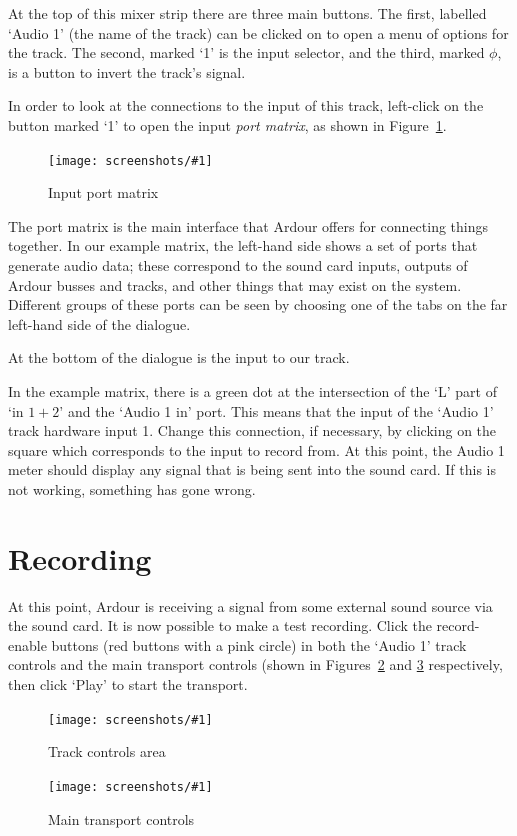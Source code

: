 \documentclass[10pt,a4paper]{book}
\newcommand{\screenshot}[3]{%
\begin{figure}[ht]%
\begin{center}
\texttt{[image: screenshots/\#1]}
\end{center}
\caption{#2}
\label{#3}
\end{figure}}
\begin{document}
{At the top of this mixer strip there are three main buttons.  The
first, labelled `Audio 1' (the name of the track) can be clicked on to
open a menu of options for the track.  The second, marked `1' is the
input selector, and the third, marked $\phi$, is a button to invert
the track's signal.

In order to look at the connections to the input of this track,
left-click on the button marked `1' to open the input \emph{port
  matrix}, as shown in Figure~\ref{fig:input-port-matrix}.

\screenshot{input-port-matrix.png}{Input port matrix}{fig:input-port-matrix}

The port matrix is the main interface that Ardour offers for
connecting things together.  In our example matrix, the left-hand side
shows a set of ports that generate audio data; these correspond to the
sound card inputs, outputs of Ardour busses and tracks, and other
things that may exist on the system.  Different groups of these ports
can be seen by choosing one of the tabs on the far left-hand side of
the dialogue.

At the bottom of the dialogue is the input to our track.

In the example matrix, there is a green dot at the intersection of the
`L' part of `in $1+2$' and the `Audio 1 in' port.  This means that the
input of the `Audio 1' track hardware input 1.  Change this
connection, if necessary, by clicking on the square which corresponds
to the input to record from.  At this point, the Audio 1 meter should
display any signal that is being sent into the sound card.  If this is
not working, something has gone wrong.

\section{Recording}

At this point, Ardour is receiving a signal from some external sound
source via the sound card.  It is now possible to make a test
recording.  Click the record-enable buttons (red buttons with a pink
circle) in both the `Audio 1' track controls and the main transport
controls (shown in Figures~\ref{fig:track-controls} and
\ref{fig:transport-controls} respectively, then click `Play' to start
the transport.

\screenshot{track-controls.png}{Track controls area}{fig:track-controls}
\screenshot{transport-controls.png}{Main transport controls}{fig:transport-controls}

}
\end{document}

